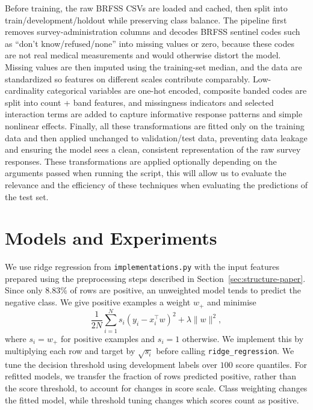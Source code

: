 \documentclass[10pt,conference,compsocconf]{IEEEtran}
\begin{document}
Before training, the raw BRFSS CSVs are loaded and cached, then
split into train/development/holdout while preserving class balance.
The pipeline first removes survey-administration columns and decodes
BRFSS sentinel codes such as “don’t know/refused/none” into missing
values or zero, because these codes are not real medical measurements
and would otherwise distort the model. Missing values are then
imputed using the training-set median, and the data are standardized
so features on different scales contribute comparably. Low-cardinality
categorical variables are one-hot encoded, composite banded codes are
split into count + band features, and missingness indicators and
selected interaction terms are added to capture informative response
patterns and simple nonlinear effects.
Finally, all these transformations are fitted only on the training
data and then applied unchanged to validation/test data, preventing
data leakage and ensuring the model sees a clean, consistent
representation of the raw survey responses.
These transformations are applied optionally depending on the
arguments passed when running the script, this will allow us to
evaluate the relevance and the efficiency of these techniques when
evaluating the predictions of the test set.

\section{Models and Experiments}
\label{sec:models}

We use ridge regression from \texttt{implementations.py} with the input features prepared using the preprocessing steps described in Section~\ref{sec:structure-paper}. Since only $8.83\%$ of
rows are positive, an unweighted model tends to predict the negative class.
We give positive examples a weight $w_{+}$ and minimise
\begin{equation}
  \label{eq:weighted-ridge}
  \frac{1}{2N}\sum_{i=1}^{N}s_i(y_i-x_i^\top w)^2
  +\lambda\lVert w\rVert^2,
\end{equation}
where $s_i=w_{+}$ for positive examples and $s_i=1$ otherwise. We implement
this by multiplying each row and target by $\sqrt{s_i}$ before calling
\texttt{ridge\_regression}. We tune the decision threshold using development
labels over $100$ score quantiles. For refitted models, we transfer the
fraction of rows predicted positive, rather than the score threshold, to
account for changes in score scale. Class weighting changes the fitted
model, while threshold tuning changes which scores count as positive.
\end{document}
